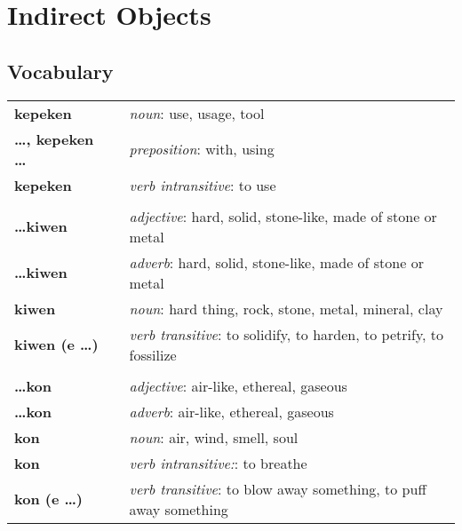 \section{Indirect Objects}
%
\subsection*{Vocabulary}
\begin{supertabular}{p{2,5cm}|ll}
%
\textbf{kepeken} && \textit{noun}: use, usage, tool \\ %
\textbf{\dots , kepeken \dots} && \textit{preposition}: with, using \\ %
\textbf{kepeken} && \textit{verb intransitive}: to use \\ %
 && \\ %
%
\textbf{\dots kiwen} && \textit{adjective}: hard, solid, stone-like, made of stone or metal \\ %
\textbf{\dots kiwen} && \textit{adverb}: hard, solid, stone-like, made of stone or metal \\ %
\textbf{kiwen} && \textit{noun}: hard thing, rock, stone, metal, mineral, clay \\ %
\textbf{kiwen (e \dots)} && \textit{verb transitive}: to solidify, to harden, to petrify, to fossilize \\ %
 && \\ %
%
\textbf{\dots kon} && \textit{adjective}: air-like, ethereal, gaseous \\ %
\textbf{\dots kon} && \textit{adverb}: air-like, ethereal, gaseous \\ %
\textbf{kon} && \textit{noun}: air, wind, smell, soul \\ %
\textbf{kon} && \textit{verb intransitive:}: to breathe \\ %
\textbf{kon (e \dots)} && \textit{verb transitive}: to blow away something, to puff away something \\ %

\end{supertabular}
